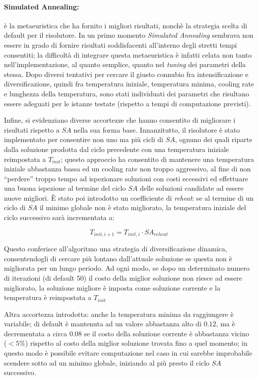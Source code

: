 \documentclass[]{article}
\newcommand{\q}[1]{``#1''}
\newcommand{\E}{È }
\begin{document}
\paragraph{Simulated Annealing:} è la metaeuristica che ha fornito i migliori risultati, nonchè la strategia scelta di default per il risolutore. In un primo momento \textit{Simulated Annealing} sembrava non essere in grado di fornire risultati soddisfacenti all'interno degli stretti tempi consentiti; la difficoltà di integrare questa metaeuristica è infatti celata non tanto nell'implementazione, al quanto semplice, quanto nel \textit{tuning} dei parametri della stessa. Dopo diversi tentativi per cercare il giusto connubio fra intensificazione e diversificazione, quindi fra temperatura iniziale, temperatura minima, cooling rate e lunghezza della temperatura, sono stati individuati dei parametri che risultano essere adeguati per le istanze testate (rispetto a tempi di computazione previsti).

 Infine, si evidenziano diverse accortezze che hanno consentito di migliorare i risultati rispetto a $SA$ nella sua forma base.
Innanzitutto, il risolutore è stato implementato per consentire non uno ma più cicli di $SA$, ognuno dei quali riparte dalla soluzione prodotta dal ciclo precedente con una temperatura iniziale reimpostata a $T_{init}$; questo approccio ha consentito di mantenere una temperatura iniziale abbastanza bassa ed un cooling rate non troppo aggressivo, al fine di non \q{perdere} troppo tempo ad ispezionare soluzioni con costi eccessivi ed effettuare una buona ispezione al termine del ciclo $SA$ delle soluzioni candidate ad essere nuove migliori. \E stato poi introdotto un coefficiente di \textit{reheat}: se al termine di un ciclo di $SA$ il minimo globale non è stato migliorato, la temperatura iniziale del ciclo successivo sarà incrementata a:

\[T_{init, i+1}=T_{init, i} \cdot SA_{reheat}\]

Questo conferisce all'algoritmo una strategia di diversificazione dinamica, consentendogli di cercare più lontano dall'attuale soluzione se questa non è migliorata per un lungo periodo. Ad ogni modo, se dopo un determinato numero di iterazioni (di default $50$) il costo della miglior soluzione non riesce ad essere migliorato, la soluzione migliore è imposta come soluzione corrente e la temperatura è reimpostata a $T_{init}$


Altra accortezza introdotta: anche la temperatura minima da raggiungere è variabile; di default è mantenuta ad un valore abbastanza alto di $0.12$, ma è decrementata a circa $0.08$ se il costo della soluzione corrente è abbastanza vicino ($<5\%$) rispetto al costo della miglior soluzione trovata fino a quel momento; in questo modo è possibile evitare computazione nel caso in cui sarebbe improbabile scendere sotto ad un minimo globale, iniziando al più presto il ciclo $SA$ successivo.
\end{document}
